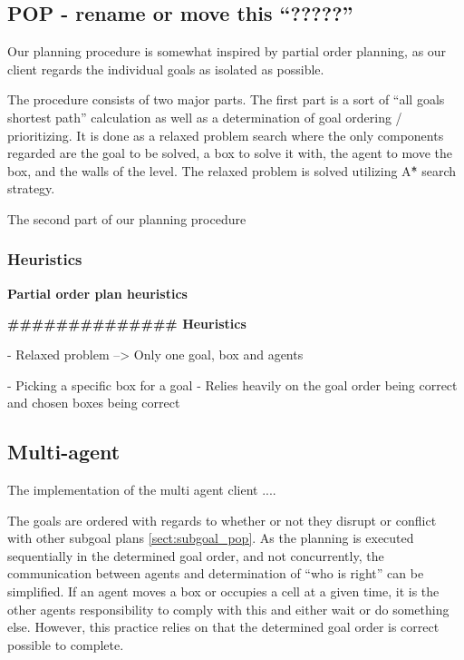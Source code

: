 \documentclass[Main]{subfiles}
\begin{document}
\subsection{POP - rename or move this ``?????'' }

Our planning procedure is somewhat inspired by partial order planning, as our client regards the individual goals as isolated as possible. 

The procedure consists of two major parts. The first part is a sort of ``all goals shortest path'' calculation as well as a determination of goal ordering / prioritizing. 
It is done as a relaxed problem search where the only components regarded are the goal to be solved, a box to solve it with, the agent to move the box, and the walls of the level. The relaxed problem is solved utilizing A\^{*} search strategy. 

The second part of our planning procedure  



\subsubsection{Heuristics}


\textbf{Partial order plan heuristics}




\textbf{\#\#\#\#\#\#\#\#\#\#\#\#\#\# Heuristics}






- Relaxed problem --> Only one goal, box and agents

- Picking a specific box for a goal
- Relies heavily on the goal order being correct and chosen boxes being correct





\subsection{Multi-agent} 

The implementation of the multi agent client  .... 



The goals are ordered with regards to whether or not they disrupt or conflict with other subgoal plans \autoref{sect:subgoal_pop}. As the planning is executed sequentially in the determined goal order, and not concurrently, the communication between agents and determination of ``who is right'' can be simplified. 
If an agent moves a box or occupies a cell at a given time, it is the other agents responsibility to comply with this and either wait or do something else. However, this practice relies on that the determined goal order is correct possible to complete. 
\end{document}
